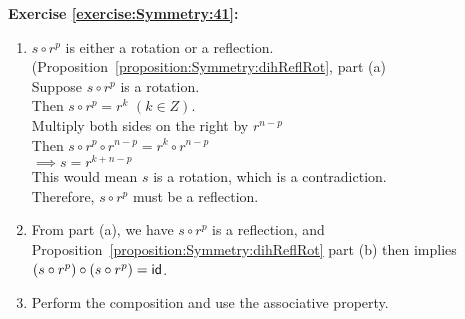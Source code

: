 \noindent\textbf{Exercise \ref{exercise:Symmetry:41}:}
\begin{enumerate}[{a.}]
\item
$s\circ r^p$ is either a rotation or a reflection. (Proposition~\ref{proposition:Symmetry:dihReflRot}, part (a)\\
Suppose $s\circ r^p$ is a rotation.\\
Then $s\circ r^p=r^k$ $(k\in Z)$.\\
Multiply both sides on the right by $r^{n-p}$\\
Then $s\circ r^p\circ r^{n-p}=r^k\circ r^{n-p}$\\
$\implies s=r^{k+n-p}$\\
This would mean $s$ is a rotation, which is a contradiction.\\
Therefore, $s\circ r^p$ must be a reflection.

\item
From part (a), we have $s\circ r^p$ is a reflection, and Proposition~\ref{proposition:Symmetry:dihReflRot} part (b) then implies 
 $(s\circ r^p)\circ (s\circ r^p) = {\sf{i}d}$.
 
\item
Perform the composition and use the associative property.
\end{enumerate}

